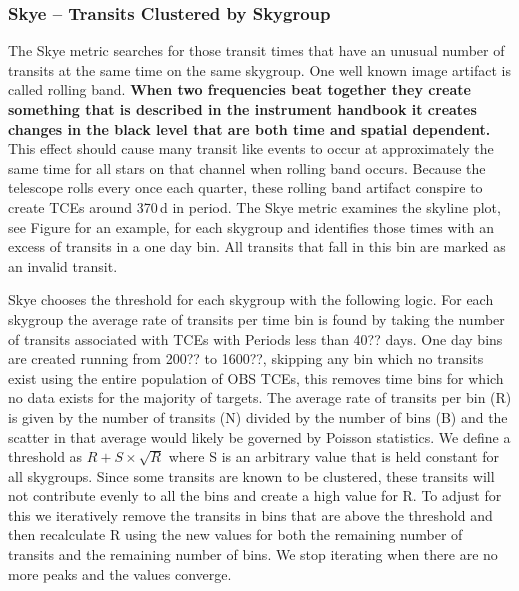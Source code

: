  
\subsubsection{Skye -- Transits Clustered by Skygroup}

The Skye metric searches for those transit times that have an unusual number of transits at the same time on the same skygroup.   One well known image artifact is called rolling band. \textbf{When two frequencies beat together they create something that is described in the instrument handbook it creates changes in the black level that are both time and spatial dependent.} This effect should cause many transit like events to occur at approximately the same time for all stars on that channel when rolling band occurs. Because the telescope rolls every once each quarter, these rolling band artifact conspire to create TCEs around 370\,d in period.  The Skye metric examines the skyline plot, see Figure\label{f:skyline} for an example, for each skygroup and identifies those times with an excess of transits in a one day bin.  All transits that fall in this bin are marked as an invalid transit.

Skye chooses the threshold for each skygroup with the following logic. For each skygroup the average rate of transits per time bin is found by taking the number of transits associated with TCEs with Periods less than 40?? days. One day bins are created running from 200?? to 1600??, skipping any bin which no transits exist using the entire population of OBS TCEs, this removes time bins for which no data exists for the majority of targets. The average rate of transits per bin (R) is given by the number of transits (N) divided by the number of bins (B) and the scatter in that average would likely be governed by Poisson statistics. We define a threshold as $R + S \times \sqrt{R}$ where S is an arbitrary value that is held constant for all skygroups. Since some transits are known to be clustered, these transits will not contribute evenly to all the bins and create a high value for R. To adjust for this we iteratively remove the transits in bins that are above the threshold and then recalculate R using the new values for both the remaining number of transits and the remaining number of bins. We stop iterating when there are no more peaks and the values converge.